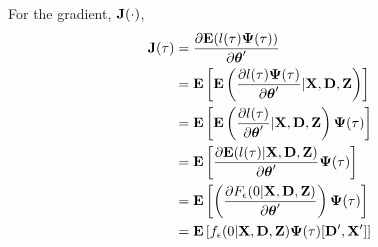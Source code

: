 For the gradient, $\Jb(\cdot)$,
\begin{align*}
\Jb(\tau) &= \frac{\partial \E(l(\tau) \Psib(\tau))}{\partial \thetab'} \\
&= \E \left[ \E \left( \frac{\partial
l(\tau) \Psib(\tau)
}{\partial \thetab'} |\Xb, \Db, \Zb \right) \right] \\
&= \E \left[ \E \left( \frac{\partial
l(\tau)
}{\partial \thetab'} |\Xb, \Db, \Zb \right) \Psib(\tau) \right] \\
&= \E \left[  \frac{\partial \E ( l(\tau) |\Xb, \Db, \Zb )
}{\partial \thetab'}  \Psib(\tau) \right] \\
&= \E \left[ \left( \frac{\partial F_{\epsilon}(0 |\Xb, \Db, \Zb)
}{\partial \thetab'}  \right) \Psib(\tau) \right] \\
&= \E \left[f_{\epsilon}(0 |\Xb, \Db, \Zb) \Psib(\tau) [\Db', \Xb'] \right] \\
\end{align*}
